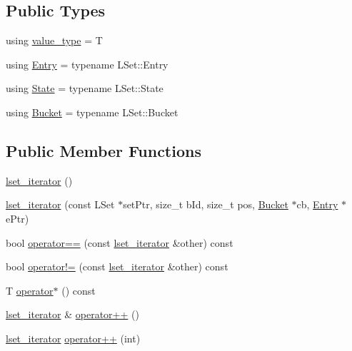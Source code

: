 \subsection*{Public Types}
\begin{DoxyCompactItemize}
\item 
using \hyperlink{classshad_1_1lset__iterator_ac9b86123c9a840daa090846707502800}{value\-\_\-type} = T
\item 
using \hyperlink{classshad_1_1lset__iterator_a62e8c31166259f0e57eb48f806f972d0}{Entry} = typename L\-Set\-::\-Entry
\item 
using \hyperlink{classshad_1_1lset__iterator_a15c9f616a8a9f87f058577ec6fb53165}{State} = typename L\-Set\-::\-State
\item 
using \hyperlink{classshad_1_1lset__iterator_a0b81feae1847d0043863c2da36bb87a6}{Bucket} = typename L\-Set\-::\-Bucket
\end{DoxyCompactItemize}
\subsection*{Public Member Functions}
\begin{DoxyCompactItemize}
\item 
\hyperlink{classshad_1_1lset__iterator_a06fb9794dc386f68ad25d623e0651235}{lset\-\_\-iterator} ()
\item 
\hyperlink{classshad_1_1lset__iterator_ac693638bf99a324c15568318028ed490}{lset\-\_\-iterator} (const L\-Set $\ast$set\-Ptr, size\-\_\-t b\-Id, size\-\_\-t pos, \hyperlink{classshad_1_1lset__iterator_a0b81feae1847d0043863c2da36bb87a6}{Bucket} $\ast$cb, \hyperlink{classshad_1_1lset__iterator_a62e8c31166259f0e57eb48f806f972d0}{Entry} $\ast$e\-Ptr)
\item 
bool \hyperlink{classshad_1_1lset__iterator_acb3bbd0bcdc02b25911b195600b674ad}{operator==} (const \hyperlink{classshad_1_1lset__iterator}{lset\-\_\-iterator} \&other) const 
\item 
bool \hyperlink{classshad_1_1lset__iterator_a2bac9439040a4d1fc93b6666c177f210}{operator!=} (const \hyperlink{classshad_1_1lset__iterator}{lset\-\_\-iterator} \&other) const 
\item 
T \hyperlink{classshad_1_1lset__iterator_a05c8551aad5145322484979eecc96c60}{operator$\ast$} () const 
\item 
\hyperlink{classshad_1_1lset__iterator}{lset\-\_\-iterator} \& \hyperlink{classshad_1_1lset__iterator_ab6efcb0bb2f2feeaf0259ebd256aeee5}{operator++} ()
\item 
\hyperlink{classshad_1_1lset__iterator}{lset\-\_\-iterator} \hyperlink{classshad_1_1lset__iterator_a14f424fab2f6dd973555f0dd7d0aa7f8}{operator++} (int)
\end{DoxyCompactItemize}
